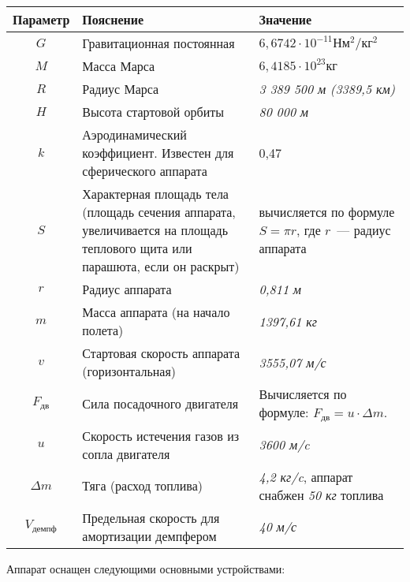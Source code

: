 \documentclass[12pt,a4paper]{article}
\begin{document}
\begin{center}
\begin{tabular}{ |c|p{6.5cm}|p{6cm}| } 
  \hline
  \textbf{Параметр} & \textbf{Пояснение} & \textbf{Значение} \\
  \hline
  $ G $ & Гравитационная постоянная & $ 6,6742 \cdot 10^{-11} \text{Н} \text{м}^{2}/\text{кг}^{2} $ \\
  \hline
  $ M $ & Масса Марса & $6,4185 \cdot 10^{23} \text{кг}$ \\
  \hline
  $ R $ & Радиус Марса & \emph{3 389 500 м (3389,5 км)} \\
  \hline
  $ H $ & Высота стартовой орбиты & \emph{80 000 м} \\
  \hline
  $ k $ & Аэродинамический коэффициент. Известен для сферического аппарата & 0,47 \\
  \hline
  $ S $ & Характерная площадь тела (площадь сечения аппарата, увеличивается на площадь
  теплового щита или парашюта, если он раскрыт) & вычисляется по формуле $ S = \pi r $, где $r$~--- радиус
  аппарата \\
  \hline
  $ r $ & Радиус аппарата & \emph{0,811 м} \\
  \hline
  $ m $ & Масса аппарата (на начало полета) & \emph{1397,61 кг} \\
  \hline
  $ v $ & Стартовая скорость аппарата (горизонтальная) & \emph{3555,07 м/с} \\
  \hline
  $ F_{\text{дв}} $ & Сила посадочного двигателя &
  Вычисляется по формуле: $ F_{\text{дв}} = u \cdot \Delta m$.\\
  \hline
  $ u $ & Скорость истечения газов из сопла двигателя & \emph{3600 м/c}\\
  \hline
  $ \Delta m $ & Тяга (расход топлива) & \emph{4,2 кг/c}, аппарат снабжен \emph{50 кг}
  топлива\\
  \hline
  $ V_{\text{демпф}}$ & Предельная скорость для амортизации демпфером & \emph{40 м/с} \\
  \hline
\end{tabular}
\end{center}

Аппарат оснащен следующими основными устройствами:
\end{document}
